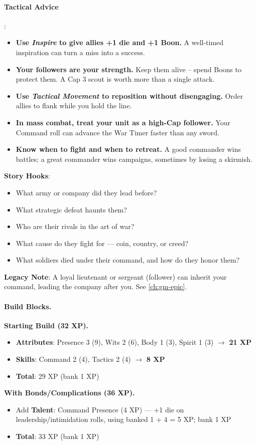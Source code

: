\paragraph{Tactical Advice}:
\begin{itemize}
\item \textbf{Use \emph{Inspire} to give allies +1 die and +1 Boon.} A well-timed inspiration can turn a miss into a success.
\item \textbf{Your followers are your strength.} Keep them alive -- spend Boons to protect them. A Cap 3 scout is worth more than a single attack.
\item \textbf{Use \emph{Tactical Movement} to reposition without disengaging.} Order allies to flank while you hold the line.
\item \textbf{In mass combat, treat your unit as a high-Cap follower.} Your Command roll can advance the War Timer faster than any sword.
\item \textbf{Know when to fight and when to retreat.} A good commander wins battles; a great commander wins campaigns, sometimes by losing a skirmish.
\end{itemize}

\textbf{Story Hooks}:
\begin{itemize}
\item What army or company did they lead before?
\item What strategic defeat haunts them?
\item Who are their rivals in the art of war?
\item What cause do they fight for --- coin, country, or creed?
\item What soldiers died under their command, and how do they honor them?
\end{itemize}

\textbf{Legacy Note}: A loyal lieutenant or sergeant (follower) can inherit your command, leading the company after you. See \ref{ch:gm-epic}.

\paragraph{Build Blocks.}
\textbf{Starting Build (32 XP).}
\begin{itemize}
\item \textbf{Attributes}: Presence 3 (9), Wits 2 (6), Body 1 (3), Spirit 1 (3) \(\rightarrow\) \textbf{21 XP}
\item \textbf{Skills}: Command 2 (4), Tactics 2 (4) \(\rightarrow\) \textbf{8 XP}
\item \textbf{Total}: 29 XP (bank 1 XP)
\end{itemize}
\textbf{With Bonds/Complications (36 XP).}
\begin{itemize}
\item Add \textbf{Talent}: Command Presence (4 XP) --- +1 die on leadership/intimidation rolls, using banked 1 + 4 = 5 XP; bank 1 XP
\item \textbf{Total}: 33 XP (bank 1 XP)
\end{itemize}

